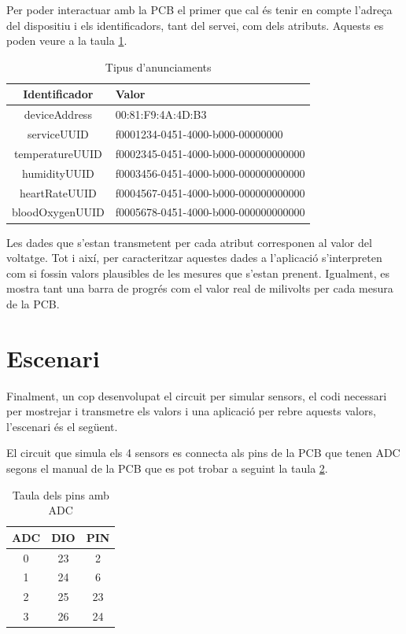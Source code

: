 Per poder interactuar amb la PCB el primer que cal és tenir en compte l'adreça del dispositiu i els identificadors, tant del servei, com dels atributs.
Aquests es poden veure a la taula \ref{taula_app}.

\begin{table}[!h]
	\begin{center}
		\begin{tabular}{|c|l|}
			\hline
			Identificador	&	Valor	\\	\hline
			deviceAddress	&	00:81:F9:4A:4D:B3	\\	\hline
			serviceUUID		&	f0001234-0451-4000-b000-00000000		\\	\hline
			temperatureUUID	&	f0002345-0451-4000-b000-000000000000	\\	\hline
			humidityUUID	&	f0003456-0451-4000-b000-000000000000	\\	\hline
			heartRateUUID	&	f0004567-0451-4000-b000-000000000000	\\	\hline
			bloodOxygenUUID	&	f0005678-0451-4000-b000-000000000000	\\	\hline
		\end{tabular}
	\end{center}
	\caption{Tipus d'anunciaments}
	\label{taula_app}
\end{table}

Les dades que s'estan transmetent per cada atribut corresponen al valor del voltatge.
Tot i així, per caracteritzar aquestes dades a l'aplicació s'interpreten com si fossin valors plausibles de les mesures que s'estan prenent.
Igualment, es mostra tant una barra de progrés com el valor real de milivolts per cada mesura de la PCB.

\section{Escenari}
Finalment, un cop desenvolupat el circuit per simular sensors, el codi necessari per mostrejar i transmetre els valors i una aplicació per rebre aquests valors, l'escenari és el següent.

El circuit que simula els 4 sensors es connecta als pins de la PCB que tenen ADC segons el manual de la PCB que es pot trobar a \cite{manual_placa} seguint la taula \ref{connexions}.

\begin{table}[!h]
	\begin{center}
		\begin{tabular}{|c|c|c|}
			\hline
			ADC			&	DIO		& 	PIN		\\	\hline
			0			&	23		&	2		\\	\hline
			1			&	24		&	6		\\	\hline
			2			&	25		&	23		\\	\hline
			3			&	26		&	24		\\	\hline
		\end{tabular}
	\end{center}
	\caption{Taula dels pins amb ADC}
	\label{connexions}
\end{table}

